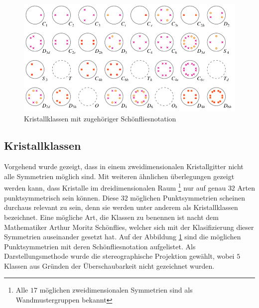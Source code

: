 \begin{figure}
    \centering
    \includegraphics[]{papers/punktgruppen/figures/projections}
    \caption{Kristallklassen mit zugehöriger Schönfliesnotation}
    \label{fig:punktgruppen:Kristallkassen}
\end{figure}

\subsection{Kristallklassen}
Vorgehend wurde gezeigt, dass in einem zweidimensionalen Kristallgitter nicht alle Symmetrien möglich sind.
Mit weiteren ähnlichen überlegungen gezeigt werden kann, dass Kristalle im dreidimensionalen Raum
\footnote{Alle $17$ möglichen zweidimensionalen Symmetrien sind als Wandmustergruppen bekannt} 
nur auf genau $32$ Arten punktsymmetrisch sein können.
Diese $32$ möglichen Punktsymmetrien scheinen durchaus relevant zu sein, denn sie werden unter anderem als Kristallklassen bezeichnet.
Eine mögliche Art, die Klassen zu benennen ist nacht dem Mathematiker Arthur Moritz Schönflies, 
welcher sich mit der Klasifizierung dieser Symmetrien auseinander gesetzt hat.
Auf der Abbildung \ref{fig:punktgruppen:Kristallkassen} sind die möglichen Punktsymmetrien mit deren Schönfliesnotation aufgelistet.
Als Darstellungsmethode wurde die stereographische Projektion gewählt, wobei $5$ Klassen aus Gründen der Überschaubarkeit nicht gezeichnet wurden.  



